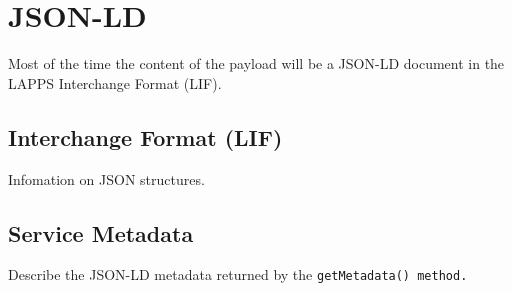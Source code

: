 
\section{JSON-LD}\label{sec:json-ld}

Most of the time the content of the payload will be a JSON-LD document in the LAPPS Interchange Format (LIF).
\subsection{\lapps Interchange Format (LIF)}\label{sec:lif}

Infomation on JSON structures.

\subsection{Service Metadata}\label{sec:metadata}

Describe the JSON-LD metadata returned by the \tt{getMetadata()} method.

